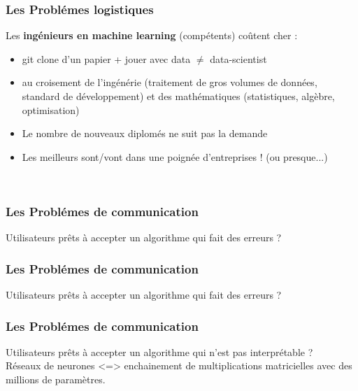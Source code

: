 \begin{frame}
  \frametitle{Les Problémes logistiques}
  Les \textbf{ingénieurs en machine learning} (compétents) coûtent cher :
  \begin{itemize}
  \item git clone d'un papier + jouer avec data $\neq$ data-scientist
  \item au croisement de l'ingénérie (traitement de gros volumes de données, standard de développement) et des mathématiques (statistiques, algèbre, optimisation)
  \item Le nombre de nouveaux diplomés ne suit pas la demande
  \item Les meilleurs sont/vont dans une poignée d'entreprises ! (ou presque...)
  \end{itemize}
  \begin{minipage}[l]{0.55\linewidth}
    ~
  \end{minipage}\hfill
  \begin{minipage}[l]{0.44\linewidth}
  \end{minipage}\hfill
\end{frame}

\begin{frame}
  \frametitle{Les Problémes de communication}
  Utilisateurs prêts à accepter un algorithme qui fait des erreurs ?
\end{frame}

\begin{frame}
  \frametitle{Les Problémes de communication}
  Utilisateurs prêts à accepter un algorithme qui fait des erreurs ?
\end{frame}

\begin{frame}
  \frametitle{Les Problémes de communication}
  Utilisateurs prêts à accepter un algorithme qui n'est pas interprétable ?\\
  Réseaux de neurones <=> enchainement de multiplications matricielles avec des millions de paramètres.
\end{frame}
